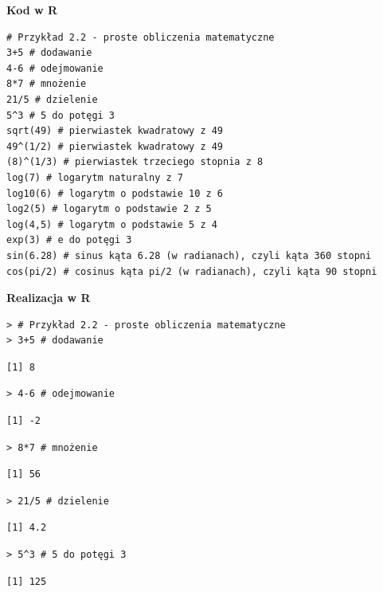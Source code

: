 \documentclass[12pt,B5paper,]{book}
\begin{document}
\textbf{Kod w R}

\begin{verbatim}
# Przykład 2.2 - proste obliczenia matematyczne
3+5 # dodawanie
4-6 # odejmowanie
8*7 # mnożenie
21/5 # dzielenie
5^3 # 5 do potęgi 3
sqrt(49) # pierwiastek kwadratowy z 49
49^(1/2) # pierwiastek kwadratowy z 49
(8)^(1/3) # pierwiastek trzeciego stopnia z 8
log(7) # logarytm naturalny z 7
log10(6) # logarytm o podstawie 10 z 6
log2(5) # logarytm o podstawie 2 z 5
log(4,5) # logarytm o podstawie 5 z 4
exp(3) # e do potęgi 3
sin(6.28) # sinus kąta 6.28 (w radianach), czyli kąta 360 stopni
cos(pi/2) # cosinus kąta pi/2 (w radianach), czyli kąta 90 stopni
\end{verbatim}

\vspace{0.8cm}

\textbf{Realizacja w R}

\begin{verbatim}
> # Przykład 2.2 - proste obliczenia matematyczne
> 3+5 # dodawanie
\end{verbatim}

\begin{verbatim}
[1] 8
\end{verbatim}

\begin{verbatim}
> 4-6 # odejmowanie
\end{verbatim}

\begin{verbatim}
[1] -2
\end{verbatim}

\begin{verbatim}
> 8*7 # mnożenie
\end{verbatim}

\begin{verbatim}
[1] 56
\end{verbatim}

\begin{verbatim}
> 21/5 # dzielenie
\end{verbatim}

\begin{verbatim}
[1] 4.2
\end{verbatim}

\begin{verbatim}
> 5^3 # 5 do potęgi 3
\end{verbatim}

\begin{verbatim}
[1] 125
\end{verbatim}
\end{document}
